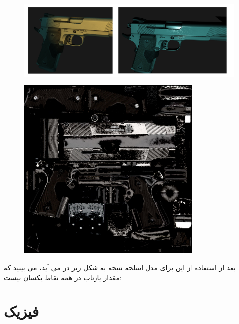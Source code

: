 \documentclass[a4paper, 12pt]{book}
\begin{document}
\begin{figure}[ht]
    \centering
    \href{https://github.com/devprofile98/shm}{
        \includegraphics[width=15cm]{images/specular-gun.png}
    }
    \caption{}
    \label{fig:my_label}
\end{figure}  
  
\begin{figure}[ht]
    \centering
    \href{https://github.com/devprofile98/shm}{
        \includegraphics[width=9cm]{images/handgun_S.jpg}
    }
    \caption{}
    \label{fig:my_label}
\end{figure}

    بعد از استفاده از این  برای مدل اسلحه نتیجه به شکل زیر در می آید، می بینید که مقدار یازتاب در همه نقاط یکسان نیست:
    

\part{فیزیک}
\begin{center}
    \chapter{}
\end{center}
\section{}
\section{}
\end{document}
